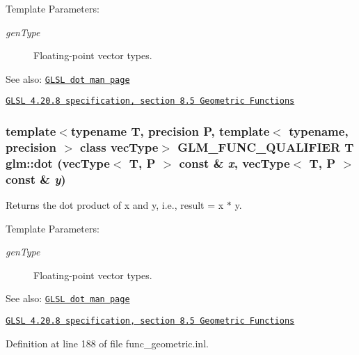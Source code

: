 \begin{Desc}
\item[Template Parameters:]
\begin{description}
\item[{\em genType}]Floating-point vector types.\end{description}
\end{Desc}
\begin{Desc}
\item[See also:]\href{http://www.opengl.org/sdk/docs/manglsl/xhtml/dot.xml}{\tt GLSL dot man page} 

\href{http://www.opengl.org/registry/doc/GLSLangSpec.4.20.8.pdf}{\tt GLSL 4.20.8 specification, section 8.5 Geometric Functions} \end{Desc}
\hypertarget{group__core__func__geometric_gc64a3b29d01336161a668d328cac97eb}{
\subsubsection[dot]{\setlength{\rightskip}{0pt plus 5cm}template$<$typename T, precision P, template$<$ typename, precision $>$ class vecType$>$ GLM\_\-FUNC\_\-QUALIFIER T glm::dot (vecType$<$ T, P $>$ const \& {\em x}, \/  vecType$<$ T, P $>$ const \& {\em y})}}
\label{group__core__func__geometric_gc64a3b29d01336161a668d328cac97eb}


Returns the dot product of x and y, i.e., result = x $\ast$ y.

\begin{Desc}
\item[Template Parameters:]
\begin{description}
\item[{\em genType}]Floating-point vector types.\end{description}
\end{Desc}
\begin{Desc}
\item[See also:]\href{http://www.opengl.org/sdk/docs/manglsl/xhtml/dot.xml}{\tt GLSL dot man page} 

\href{http://www.opengl.org/registry/doc/GLSLangSpec.4.20.8.pdf}{\tt GLSL 4.20.8 specification, section 8.5 Geometric Functions} \end{Desc}


Definition at line 188 of file func\_\-geometric.inl.


